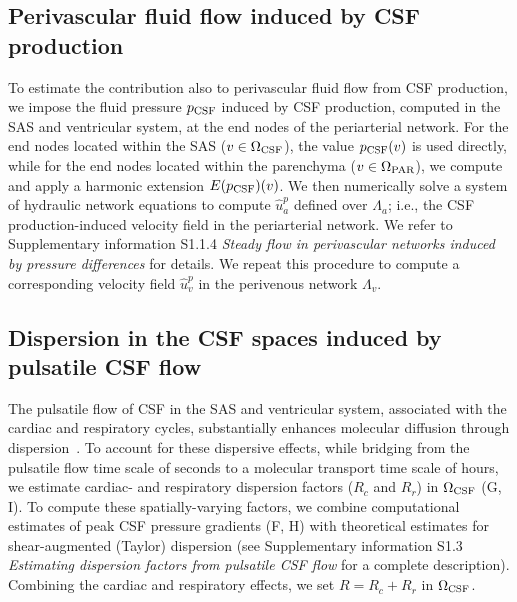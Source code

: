\documentclass[fleqn,10pt]{wlscirep}
\begin{document}
\subsection*{Perivascular fluid flow induced by CSF production}

To estimate the contribution also to perivascular fluid flow from CSF
production, we impose the fluid pressure $p_{\rm CSF}$ induced by CSF
production, computed in the SAS and ventricular system, at the end
nodes of the periarterial network. For the end nodes located within
the SAS ($v \in \Omega_{\rm CSF}$), the value $p_{\rm CSF}(v)$ is used
directly, while for the end nodes located within the parenchyma ($v \in
\Omega_{\rm PAR}$), we compute and apply a harmonic extension
$E(p_{\rm CSF})(v)$. We then numerically solve a system of hydraulic
network equations to compute $\hat{u}^p_a$ defined over $\Lambda_a$;
i.e., the CSF production-induced velocity field in the periarterial
network. We refer to Supplementary information S1.1.4 \emph{Steady
flow in perivascular networks induced by pressure differences} for
details. We repeat this procedure to compute a corresponding velocity
field $\hat{u}^p_v$ in the perivenous network $\Lambda_v$.

\subsection*{Dispersion in the CSF spaces induced by pulsatile CSF flow}

The pulsatile flow of CSF in the SAS and ventricular system,
associated with the cardiac and respiratory cycles, substantially
enhances molecular diffusion through
dispersion~\cite{taylor1953dispersion, watson1983diffusion,
  asgari2016glymphatic, sharp2019dispersion, ray2021quantitative,
  troyetsky2021dispersion}. To account for these dispersive effects,
while bridging from the pulsatile flow time scale of seconds to a
molecular transport time scale of hours, we estimate cardiac- and
respiratory dispersion factors ($R_c$ and $R_r$) in $\Omega_{\rm CSF}$
(G, I). To compute these spatially-varying factors, we
combine computational estimates of peak CSF pressure gradients
(F, H) with theoretical estimates for shear-augmented
(Taylor) dispersion \cite{taylor1953dispersion, watson1983diffusion,
  sharp2019dispersion} (see Supplementary information S1.3 \emph{Estimating
dispersion factors from pulsatile CSF flow} for a complete
description). Combining the cardiac and respiratory effects, we set $R
= R_c + R_r$ in $\Omega_{\rm CSF}$. 
\end{document}
